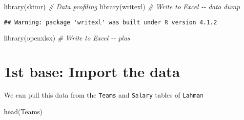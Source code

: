 \documentclass[
]{article}
\newenvironment{Shaded}{\begin{snugshade}}{\end{snugshade}}
\newcommand{\CommentTok}[1]{\textcolor[rgb]{0.56,0.35,0.01}{\textit{#1}}}
\newcommand{\FunctionTok}[1]{\textcolor[rgb]{0.00,0.00,0.00}{#1}}
\newcommand{\NormalTok}[1]{#1}
\begin{document}
\begin{Shaded}
\begin{Highlighting}[]
\FunctionTok{library}\NormalTok{(skimr)  }\CommentTok{\# Data profiling}
\FunctionTok{library}\NormalTok{(writexl) }\CommentTok{\# Write to Excel {-}{-} data dump}
\end{Highlighting}
\end{Shaded}

\begin{verbatim}
## Warning: package 'writexl' was built under R version 4.1.2
\end{verbatim}

\begin{Shaded}
\begin{Highlighting}[]
\FunctionTok{library}\NormalTok{(openxlsx) }\CommentTok{\# Write to Excel {-}{-} plus }
\end{Highlighting}
\end{Shaded}

\hypertarget{st-base-import-the-data}{%
\section{1st base: Import the data}\label{st-base-import-the-data}}

We can pull this data from the \texttt{Teams} and \texttt{Salary} tables
of \texttt{Lahman}

\begin{Shaded}
\begin{Highlighting}[]
\FunctionTok{head}\NormalTok{(Teams)}
\end{Highlighting}
\end{Shaded}
\end{document}
